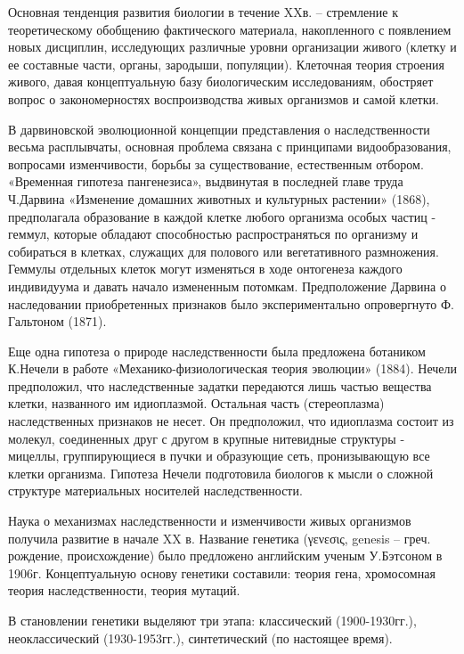 \documentclass[exam_answers.tex]{subfiles}
\begin{document}
\renewcommand{\baselinestretch}{\blch}

Основная тенденция развития биологии в течение XXв. – стремление к
теоретическому обобщению фактического материала, накопленного с
появлением новых дисциплин, исследующих различные уровни организации
живого (клетку и ее составные части, органы, зародыши, популяции).
Клеточная теория строения живого, давая концептуальную базу биологическим
исследованиям, обостряет вопрос о закономерностях воспроизводства живых
организмов и самой клетки.

В дарвиновской эволюционной концепции представления о
наследственности весьма расплывчаты, основная проблема связана с
принципами видообразования, вопросами изменчивости, борьбы за
существование, естественным отбором. «Временная гипотеза пангенезиса»,
выдвинутая в последней главе труда Ч.Дарвина «Изменение домашних
животных и культурных растении» (1868), предполагала образование в каждой
клетке любого организма особых частиц - геммул, которые обладают
способностью распространяться по организму и собираться в клетках,
служащих для полового или вегетативного размножения. Геммулы отдельных
клеток могут изменяться в ходе онтогенеза каждого индивидуума и давать
начало измененным потомкам. Предположение Дарвина о наследовании
приобретенных признаков было экспериментально опровергнуто Ф. Гальтоном
(1871).

Еще одна гипотеза о природе наследственности была предложена
ботаником К.Нечели в работе «Механико-физиологическая теория эволюции»
(1884). Нечели предположил, что наследственные задатки передаются лишь
частью вещества клетки, названного им идиоплазмой. Остальная часть
(стереоплазма) наследственных признаков не несет. Он предположил, что
идиоплазма состоит из молекул, соединенных друг с другом в крупные
нитевидные структуры - мицеллы, группирующиеся в пучки и образующие
сеть, пронизывающую все клетки организма. Гипотеза Нечели подготовила
биологов к мысли о сложной структуре материальных носителей
наследственности.

Наука о механизмах наследственности и изменчивости живых организмов
получила развитие в начале XX в. Название генетика (γενεσις, genesis – греч.
рождение, происхождение) было предложено английским ученым У.Бэтсоном в
1906г. Концептуальную основу генетики составили: теория гена, хромосомная
теория наследственности, теория мутаций.

В становлении генетики выделяют три этапа: классический (1900-1930гг.),
неоклассический (1930-1953гг.), синтетический (по настоящее время).
\end{document}

